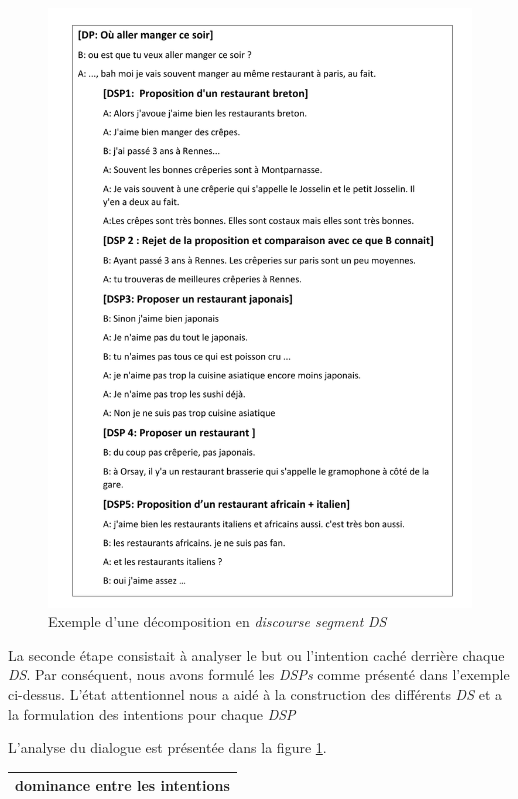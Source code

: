 			 \begin{figure}[!h]
			 	\includegraphics[width=5in]{Figures/dsp_analysis.pdf}
			 	\caption{\label{fig:DSP} Exemple d'une décomposition en \emph{discourse segment} \emph{DS}}
			 \end{figure} 
			 
			 La seconde étape consistait à analyser le but ou l'intention caché derrière chaque \emph{DS}. Par conséquent, nous avons formulé les \emph{DSPs} comme présenté dans l'exemple ci-dessus. L'état attentionnel nous a aidé à la construction des différents \emph{DS} et a la formulation des intentions pour chaque \emph{DSP}	
			
			L'analyse du dialogue est présentée dans la figure \ref{fig:DSP}.
			
			\begin{table}
				\begin{tabular} {c}
					\hline
					\hline
					dominance entre les intentions \\
					\hline
					\hline
				\end{tabular}
			\end{table}
			
